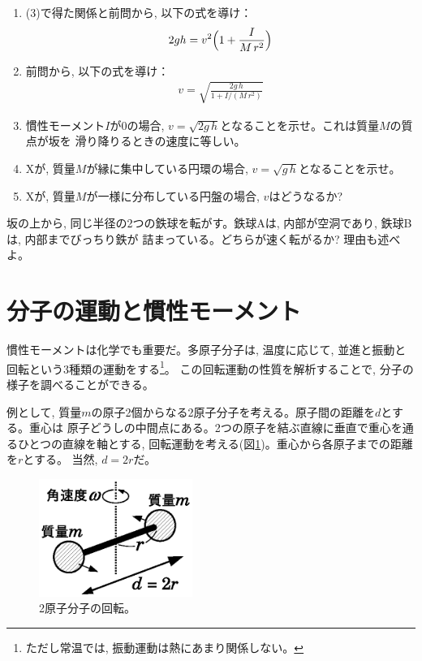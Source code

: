 \begin{q}
\begin{enumerate}
\item (3)で得た関係と前問から, 以下の式を導け：
\begin{eqnarray}
2gh=v^2\Bigl(1+\frac{I}{M\,r^2}\Bigr)\label{eq:mominert_wheel_slope3}
\end{eqnarray}
\item 前問から, 以下の式を導け：
\begin{eqnarray}
v=\sqrt{\frac{2g\,h}{1+I/(M\,r^2)}}\label{eq:mominert_wheel_slope_v}
\end{eqnarray}
\item 慣性モーメント$I$が0の場合, $v=\sqrt{2g\,h}$となることを示せ。これは質量$M$の質点が坂を
滑り降りるときの速度に等しい。
\item Xが, 質量$M$が縁に集中している円環の場合, $v=\sqrt{g\,h}$となることを示せ。
\item Xが, 質量$M$が一様に分布している円盤の場合, $v$はどうなるか?
\end{enumerate}
\end{q}
\mv

%
\begin{q}\label{q:mominert_ball_slope}
坂の上から, 同じ半径の2つの鉄球を転がす。鉄球Aは, 内部が空洞であり, 鉄球Bは, 内部までびっちり鉄が
詰まっている。どちらが速く転がるか? 理由も述べよ。
\end{q}
\hv


\section{分子の運動と慣性モーメント}

慣性モーメントは化学でも重要だ。多原子分子は, 温度に応じて, 並進と振動と
回転という3種類の運動をする\footnote{ただし常温では, 振動運動は熱にあまり関係しない。}。
この回転運動の性質を解析することで, 分子の様子を調べることができる。

例として, 質量$m$の原子2個からなる2原子分子を考える。原子間の距離を$d$とする。重心は
原子どうしの中間点にある。2つの原子を結ぶ直線に垂直で重心を通るひとつの直線を軸とする, 
回転運動を考える(図\ref{fig:angular_mom_H2})。重心から各原子までの距離を$r$とする。
当然, $d=2r$だ。
\begin{figure}[h]
    \centering
    \includegraphics[width=5cm]{angular_mom_2balls.eps}
    \caption{2原子分子の回転。}\label{fig:angular_mom_H2}
\end{figure}

